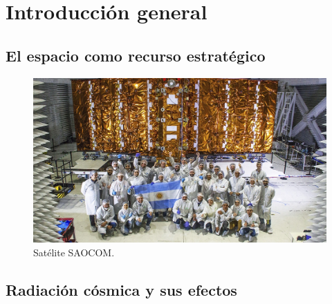 
\chapter{Introducción general} %

\label{Chapter1} %
\label{IntroGeneral}


\newcommand{\keyword}[1]{\textbf{#1}}
\newcommand{\tabhead}[1]{\textbf{#1}}
\newcommand{\code}[1]{\texttt{#1}}
\newcommand{\file}[1]{\texttt{\bfseries#1}}
\newcommand{\option}[1]{\texttt{\itshape#1}}
\newcommand{\grados}{$^{\circ}$}



\section{El espacio como recurso estratégico}
\label{sec:invap}

\begin{figure}[htbp]
	\centering
	\includegraphics[width=.8\textwidth]{./Figures/invapsaocom.jpg}
	\caption{Satélite SAOCOM\citep{WEBSITE:invap}.}
	\label{fig:saocom}
\end{figure}

\section{Radiación cósmica y sus efectos}
\label{sec:radiacion}

